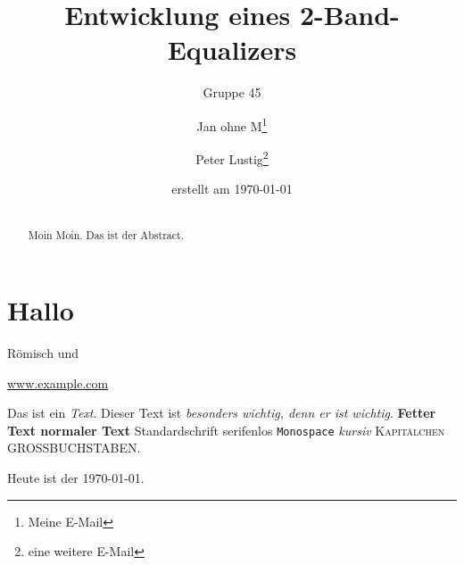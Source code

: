 \documentclass[%
	paper		=	a4,							%
	fontsize	=	11pt,						%
	DIV			=	calc,						%
	twocolumn	=	false,						%
	twoside		=	false,						%
	headsepline	=	true,						%
]{scrreprt}										%
\title{Entwicklung eines 2-Band-Equalizers}
\subtitle{Gruppe 45}
\author{Jan ohne M\thanks{Meine E-Mail} \and Peter Lustig\thanks{eine weitere E-Mail}}
\date{erstellt am \today}
\begin{document}
\maketitle

\tableofcontents

\listoffigures

\listoftables

\lstlistoflistings


\begin{abstract}
	\let\raggedsection\centering
	\section*{\abstractname}
	\let\raggedsection\raggedright
	Moin Moin. Das ist der Abstract.\par
	\blindtext\par
	\authorbarsabstract
\end{abstract}



\chapter{Hallo}

Römisch  und 

\cite{einstein}

\url{www.example.com}

Das ist ein \emph{Text}. Dieser Text ist \emph{besonders wichtig, denn er ist \emph{wichtig}}. \textbf{Fetter Text \textnormal{normaler Text}} \textrm{Standardschrift} \textsf{serifenlos} \texttt{Monospace} \textit{kursiv} \textsc{Kapitälchen} \uppercase{Großbuchstaben}.

Heute ist der \today. \blindtext
\end{document}
